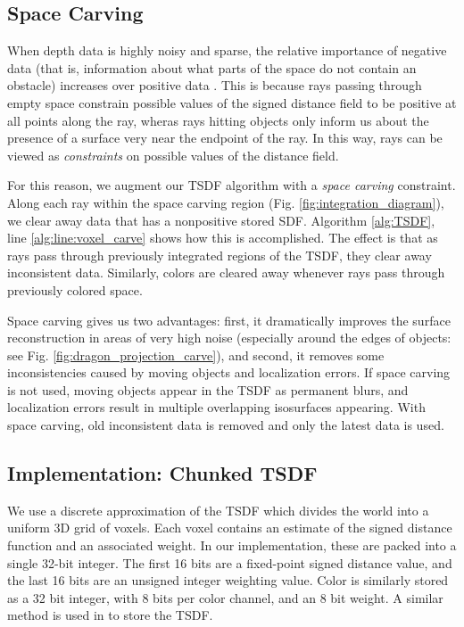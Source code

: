 \documentclass[10pt,twocolumn,letterpaper]{article}
\begin{document}
\subsection{Space Carving}
\label{section:carving}
When depth data is highly noisy and sparse, the relative importance of negative
data (that is, information about what parts of the space do not contain an
obstacle) increases over positive data \cite{Klingensmith2014}. This is because
rays passing through empty space constrain possible values of the signed
distance field to be positive at all points along the ray, wheras rays hitting
objects only inform us about the presence of a surface very near the endpoint of
the ray. In this way, rays can be viewed as \textit{constraints} on possible
values of the distance field. 

For this reason, we augment our TSDF algorithm with a \textit{space carving}
constraint. Along each ray within the space carving region (Fig.
\ref{fig:integration_diagram}), we clear away data that has a nonpositive stored
SDF. Algorithm \ref{alg:TSDF}, line \ref{alg:line:voxel_carve} shows how this is
accomplished. The effect is that as rays pass through previously integrated
regions of the TSDF, they clear away inconsistent data. Similarly, colors are
cleared away whenever rays pass through previously colored space.

Space carving gives us two advantages: first, it dramatically improves the
surface reconstruction in areas of very high noise (especially around the edges
of objects: see Fig. \ref{fig:dragon_projection_carve}), and second, it removes
some inconsistencies caused by moving objects and localization errors. If space
carving is not used, moving objects appear in the TSDF as permanent blurs, and
localization errors result in multiple overlapping isosurfaces appearing. With
space carving, old inconsistent data is removed and only the latest data is used.

\subsection{Implementation: Chunked TSDF}
We use a discrete approximation of the TSDF which divides the world into
a uniform 3D grid of voxels. Each voxel contains an estimate of the signed
distance function and an associated weight. In our implementation, these are
packed into a single 32-bit integer. The first 16 bits are a fixed-point
signed distance value, and the last 16 bits  are an unsigned integer weighting
value. Color is similarly stored as a 32 bit integer, with 8 bits per color
channel, and an 8 bit weight. A similar method is used in \cite{Newcombe,
Whelan2013, Bylow2013} to store the TSDF.
\end{document}

